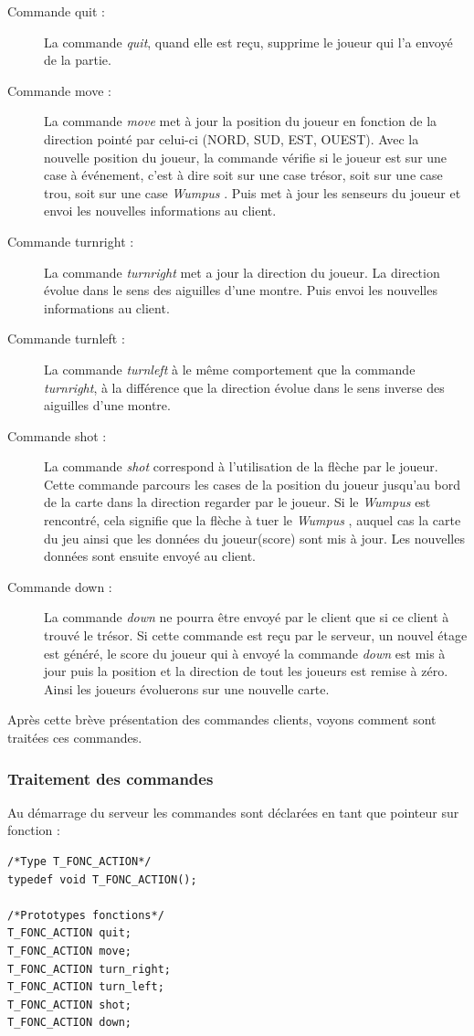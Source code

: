 \documentclass[a4paper,10pt]{article}
\newcommand{\gameName}{\emph{Wumpus }}
\begin{document}
	\begin{description}
		\item[Commande quit : ] La commande \emph{quit}, quand elle est reçu, supprime le joueur qui l'a envoyé de la partie.
		\item[Commande move : ] La commande \emph{move} met à jour la position du joueur en fonction de la direction pointé par celui-ci (NORD, SUD, EST, OUEST).
Avec la nouvelle position du joueur, la commande vérifie si le joueur est sur une case à événement, c'est à dire soit sur une case trésor, soit sur une case
trou, soit sur une case \gameName. Puis met à jour les senseurs du joueur et envoi les nouvelles informations au client.
		\item[Commande turnright : ] La commande \emph{turnright} met a jour la direction du joueur. La direction évolue dans le sens des aiguilles d'une
montre. Puis envoi les nouvelles informations au client.
		\item[Commande turnleft : ] La commande \emph{turnleft} à le même comportement que la commande \emph{turnright}, à la différence que la direction
évolue dans le sens inverse des aiguilles d'une montre.
		\item[Commande shot : ] La commande \emph{shot} correspond à l'utilisation de la flèche par le joueur. Cette commande parcours les cases de la position
du joueur jusqu'au bord de la carte dans la direction regarder par le joueur. Si le \gameName est rencontré, cela signifie que la flèche à tuer le \gameName,
auquel cas la carte du jeu ainsi que les données du joueur(score) sont mis à jour. Les nouvelles données sont ensuite envoyé au client.
		\item[Commande down : ] La commande \emph{down} ne pourra être envoyé par le client que si ce client à trouvé le trésor. Si cette commande est reçu par
le serveur, un nouvel étage est généré, le score du joueur qui à envoyé la commande \emph{down} est mis à jour puis la position et la direction de tout les
joueurs est remise à zéro. Ainsi les joueurs évoluerons sur une nouvelle carte.
	\end{description}

	Après cette brève présentation des commandes clients, voyons comment sont traitées ces commandes.
	\subsubsection{Traitement des commandes}
	\label{subsubTraitCommandes}

	Au démarrage du serveur les commandes sont déclarées en tant que pointeur sur fonction :
	\begin{lstlisting}
/*Type T_FONC_ACTION*/
typedef void T_FONC_ACTION();

/*Prototypes fonctions*/
T_FONC_ACTION quit;
T_FONC_ACTION move;
T_FONC_ACTION turn_right;
T_FONC_ACTION turn_left;
T_FONC_ACTION shot;
T_FONC_ACTION down;

	\end{lstlisting}
\end{document}

